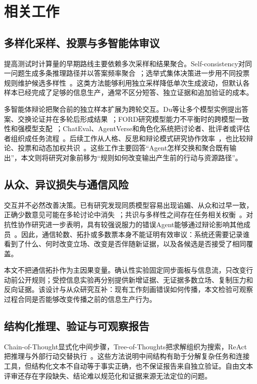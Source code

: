 \section{相关工作}\label{sec:related}

\subsection{多样化采样、投票与多智能体审议}
提高测试时计算量的早期路线主要依赖多次采样和结果聚合。Self-consistency对同一问题生成多条推理路径并以答案频率聚合~\cite{wang2023selfconsistency}；选举式集体决策进一步用不同投票规则维护候选多样性~\cite{zhao2024electoral}。这类方法能够利用独立采样降低单次生成波动，但默认各样本已经完成了足够的信息生产，通常不区分短答、独立证据和追加验证的成本。

多智能体辩论把聚合前的独立样本扩展为跨轮交互。Du等让多个模型实例提出答案、交换论证并在多轮后形成结果~\cite{du2024improving}；FORD研究模型能力不平衡时的跨模型一致性和强模型支配~\cite{xiong2023interconsistency}；ChatEval、AgentVerse和角色化系统把讨论者、批评者或评估者组织成任务流程~\cite{chan2023chateval,chen2023agentverse}。后续工作从人格、反思和辩论模式研究协作效率~\cite{zhang2024collaboration}，也比较辩论、投票和动态加权共识~\cite{choi2025debate,li2025dynamic}。这些工作主要回答“Agent怎样交换和聚合既有输出”，本文则将研究对象前移为“规则如何改变输出产生前的行动与资源路径”。

\subsection{从众、异议损失与通信风险}
交互并不必然改善决策。已有研究发现同质模型容易出现谄媚、从众和过早一致，正确少数意见可能在多轮讨论中消失~\cite{pitre2025consensagent,swamy2025peacemaker}；共识与多样性之间存在任务相关权衡~\cite{wu2025disagreement}。对抗性协作研究进一步表明，具有较强说服力的错误Agent能够通过辩论影响其他成员~\cite{amayuelas2024multiagent}。因此，通信轮数、拓扑或多数票本身不能证明有效审议：系统还需要记录谁看到了什么、何时改变立场、改变是否伴随新证据，以及各候选是否接受了相同覆盖。

本文不把通信拓扑作为主因果变量。确认性实验固定同步面板与信息流，只改变行动前公开规则；受控信息实验再分别提供新增证据、无证据多数立场、复制压力和反向证据。该设计与从众研究互补：现有工作刻画错误如何传播，本文检验可观察过程合同是否能够改变传播之前的信息生产行为。

\subsection{结构化推理、验证与可观察报告}
Chain-of-Thought显式化中间步骤，Tree-of-Thoughts把求解组织为搜索，ReAct把推理与外部行动交替执行~\cite{wei2022chain,yao2024tree,yao2023react}。这些方法说明中间结构有助于分解复杂任务和连接工具，但结构化文本不自动等于事实正确，也不保证报告来自独立验证。自由文本评审还存在字段缺失、结论难以规范化和证据来源无法定位的问题。

